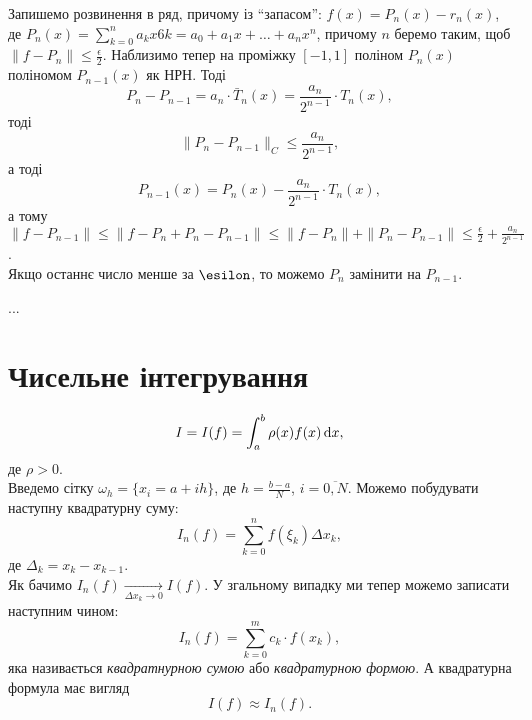 \begin{solution}
	Запишемо розвинення в ряд, причому із ``запасом'': $f(x) = P_n(x) - r_n(x)$, де $P_n(x) = \sum_{k = 0}^n a_k x6k = a_0 + a_1 x + \ldots + a_n x^n$, причому $n$ беремо таким, щоб $\|f - P_n\| \le \frac\epsilon2$. Наблизимо тепер на проміжку $[-1, 1]$ поліном $P_n(x)$ поліномом $P_{n - 1}(x)$ як НРН. Тоді 
	\begin{equation}
		\label{eq:5.6}
		P_n - P_{n - 1} = a_n \cdot \bar T_n (x) = \frac{a_n}{2^{n - 1}} \cdot T_n(x),
	\end{equation}
	тоді
	\begin{equation}
		\label{eq:5.7}
		\|P_n - P_{n - 1}\|_C \le \frac{a_n}{2^{n - 1}},
	\end{equation}
	а тоді 
	\begin{equation}
		\label{eq:5.8}
		P_{n - 1}(x) = P_n(x) - \frac{a_n}{2^{n - 1}} \cdot T_n(x),
	\end{equation}
	а тому
	$\|f - P_{n - 1}\| \le \|f - P_n + P_n - P_{n - 1} \| \le \|f - P_n\| + \|P_n - P_{n - 1}\| \le \frac\epsilon2 + \frac{a_n}{2^{n - 1}}$. \\

	Якщо останнє число менше за $\esilon$, то можемо $P_n$ замінити на $P_{n - 1}$.
\end{solution}

...

\section{Чисельне інтегрування}

\begin{equation}
	\label{eq:6.1}
	I = I(f) = \int_a^b \rho(x) f(x) \mathop{}\!\mathrm{d} x,
\end{equation}
де $\rho > 0$. \\

Введемо сітку $\omega_h = \{ x_i = a + i h \}$, де $h = \frac{b - a}{N}$, $i = \overline{0, N}$. Можемо побудувати наступну квадратурну суму:
\begin{equation}
	\label{eq:6.2}
	I_n (f) = \sum_{k = 0}^n f(\xi_k) \Delta x_k,
\end{equation}
де $\Delta_k = x_k - x_{k - 1}$. \\

Як бачимо $I_n(f) \xrightarrow[\Delta x_k \to 0]{} I(f)$. У згальному випадку ми тепер можемо записати наступним чином: 
\begin{equation}
	\label{eq:6.3}
	I_n(f) = \sum_{k = 0}^m c_k \cdot f(x_k),
\end{equation}
яка називається \textit{квадратнурною сумою} або \textit{квадратурною формою}. А квадратурна формула має вигляд
\begin{equation}
	\label{eq:6.4}
	I(f) \approx I_n(f).
\end{equation}

